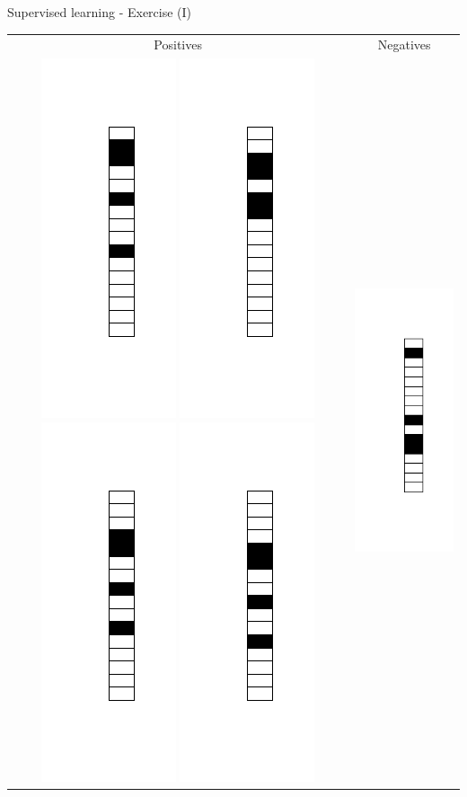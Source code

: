 \documentclass[color=usenames,dvipsnames]{beamer}
\begin{document}
\begin{frame}{Supervised learning - Exercise (I)} 



\begin{table}[ht]
	\centering
	\begin{tabular}{c|c}
		Positives&Negatives\\
		\includegraphics[width=0.1\linewidth]{../figures/1d_pattern_supervised_learning_1.png}
		\includegraphics[width=0.1\linewidth]{../figures/1d_pattern_supervised_learning_2.png}
		\includegraphics[width=0.1\linewidth]{../figures/1d_pattern_supervised_learning_3.png}
		\includegraphics[width=0.1\linewidth]{../figures/1d_pattern_supervised_learning_4.png}&
		\includegraphics[width=0.1\linewidth]{../figures/1d_random_supervised_learning_1.png}

\end{tabular}
\end{table}
\end{frame}
\end{document}
